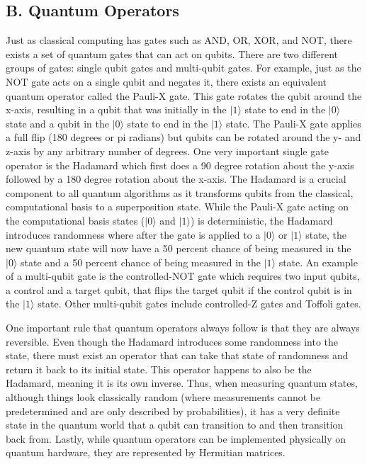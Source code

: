 \documentclass[
	a4paper, %
	10pt, %
	unnumberedsections, %
	twoside, %
]{LTJournalArticle}
\newcommand{\ket}[1]{\lvert#1\rangle} %
\begin{document}
\subsection{B. Quantum Operators}
Just as classical computing has gates such as AND, OR, XOR, and NOT, there exists a set of quantum gates that can act on qubits. There are two different groups of gates: single 
qubit gates and multi-qubit gates. For example, just as the NOT gate acts on a single qubit and negates it, there exists an equivalent quantum operator called the Pauli-X gate. 
This gate rotates the qubit around the x-axis, resulting in a qubit that was initially in the $\ket{1}$ state to end in the $\ket{0}$ state and a qubit in the $\ket{0}$ state 
to end in the $\ket{1}$ state. The Pauli-X gate applies a full flip (180 degrees or pi radians) but qubits can be rotated around the y- and z-axis by any arbitrary number of degrees. 
One very important single gate operator is the Hadamard which first does a 90 degree rotation about the y-axis followed by a 180 degree rotation about the x-axis. The Hadamard is 
a crucial component to all quantum algorithms as it transforms qubits from the classical, computational basis to a superposition state. While the Pauli-X gate acting on the 
computational basis states ($\ket{0}$ and $\ket{1}$) is deterministic, the Hadamard introduces randomness where after the gate is applied to a $\ket{0}$ or $\ket{1}$ state, the new 
quantum state will now have a 50 percent chance of being measured in the $\ket{0}$ state and a 50 percent chance of being measured in the $\ket{1}$ state. An example of a 
multi-qubit gate is the controlled-NOT gate which requires two input qubits, a control and a target qubit, that flips the target qubit if the control qubit is in the $\ket{1}$ state. 
Other multi-qubit gates include controlled-Z gates and Toffoli gates.

One important rule that quantum operators always follow is that they are always reversible. Even though the Hadamard introduces some randomness into the state, there must exist an 
operator that can take that state of randomness and return it back to its initial state. This operator happens to also be the Hadamard, meaning it is its own inverse. Thus, when 
measuring quantum states, although things look classically random (where measurements cannot be predetermined and are only described by probabilities), it has a very definite state 
in the quantum world that a qubit can transition to and then transition back from. Lastly, while quantum operators can be implemented physically on quantum hardware, they are 
represented by Hermitian matrices.
\end{document}
